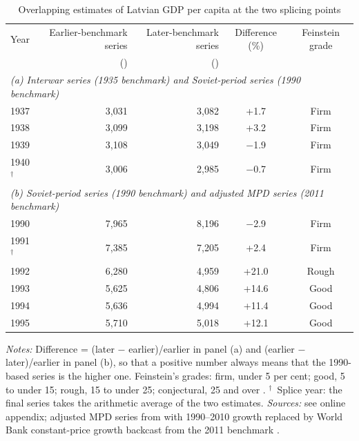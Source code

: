 \begin{table}[htbp]
\centering\small
\caption{Overlapping estimates of Latvian GDP per capita at the two splicing points}
\label{tab:overlaps}
\begin{threeparttable}
\begin{tabular}{lrrcc}
\toprule
Year & Earlier-benchmark series & Later-benchmark series & Difference (\%) & Feinstein grade \\
& (\intlnineteen{}) & (\intlnineteen{}) & & \\
\midrule
\multicolumn{5}{l}{\textit{(a) Interwar series (1935 benchmark) and Soviet-period series (1990 benchmark)}} \\
1937 & 3,031 & 3,082 & +1.7 & Firm \\
1938 & 3,099 & 3,198 & +3.2 & Firm \\
1939 & 3,108 & 3,049 & $-$1.9 & Firm \\
1940$^{\dagger}$ & 3,006 & 2,985 & $-$0.7 & Firm \\
\midrule
\multicolumn{5}{l}{\textit{(b) Soviet-period series (1990 benchmark) and adjusted MPD series (2011 benchmark)}} \\
1990 & 7,965 & 8,196 & $-$2.9 & Firm \\
1991$^{\dagger}$ & 7,385 & 7,205 & +2.4 & Firm \\
1992 & 6,280 & 4,959 & +21.0 & Rough \\
1993 & 5,625 & 4,806 & +14.6 & Good \\
1994 & 5,636 & 4,994 & +11.4 & Good \\
1995 & 5,710 & 5,018 & +12.1 & Good \\
\bottomrule
\end{tabular}
\begin{tablenotes}
\footnotesize
\textit{Notes:} Difference = (later $-$ earlier)/earlier in panel (a) and (earlier $-$ later)/earlier in panel (b), so that a positive number always means that the 1990-based series is the higher one. Feinstein's grades: firm, under 5 per cent; good, 5 to under 15; rough, 15 to under 25; conjectural, 25 and over \parencite[21]{feinstein1972}. $^{\dagger}$~Splice year: the final series takes the arithmetic average of the two estimates. \textit{Sources:} see online appendix; adjusted MPD series from \textcite{mpd2023} with 1990--2010 growth replaced by World Bank constant-price growth backcast from the 2011 benchmark \parencite{wdi2024}.
\end{tablenotes}
\end{threeparttable}
\end{table}
